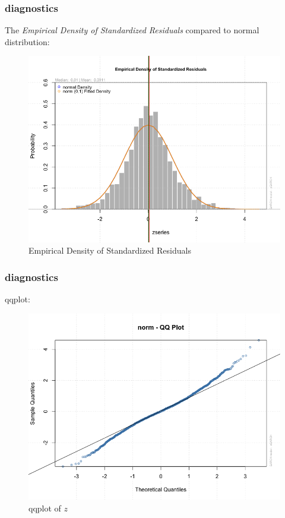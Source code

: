 \documentclass[9pt]{beamer}
\begin{document}
\begin{frame}[fragile]
\frametitle{diagnostics}
The \textit{Empirical Density of Standardized Residuals} compared to normal distribution:
\begin{figure}[H]
\centering
\caption{Empirical Density of Standardized Residuals}
\includegraphics[scale=.35]{density.png}
\end{figure}
\end{frame}

\begin{frame}[fragile]
\frametitle{diagnostics}
qqplot:
\begin{figure}[H]
\centering
\caption{qqplot of $z$}
\includegraphics[scale=.35]{qqplot.png}
\end{figure}

\end{frame}
\end{document}
